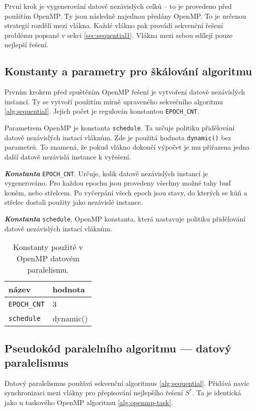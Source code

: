 \documentclass{article}
\newcommand{\const}[1]{\texttt{#1}}
\newcommand{\konstanta}[1]{\textbf{\textit{Konstanta}} \const{#1}.}
\begin{document}
    První krok je vygenerování datově nezávislých celků – to je provedeno před použitím OpenMP.
    Ty jsou následně najednou předány OpenMP. To je určenou strategií rozdělí mezi vlákna.
    Každé vlákno pak provádí sekvenční řešení problému popsané v sekci \ref{sec:sequential1}.
    Vlákna mezi sebou sdílejí pouze nejlepší řešení.

    \subsection{Konstanty a parametry pro škálování algoritmu}
    Prvním krokem před spuštěním OpenMP řešení je vytvoření datově nezávislých instancí.
    Ty se vytvoří použitím mírně upraveného sekvečního algoritmu \ref{alg:sequential}.
    Jejich počet je regulován konstantou \const{EPOCH_CNT}.

    Parametrem OpenMP je konstanta \const{schedule}. Ta určuje politiku přidělování datově nezávislých instací vláknům.
    Zde je použitá hodnota \const{dynamic()} bez parametrů. To znamená, že pokud vlákno dokončí výpočet je mu
    přiřazena jedna další datově nezávislá instance k vyřešení.

    \konstanta{EPOCH_CNT} Určuje, kolik datově nezávislých instancí je vygenerováno.
    Pro každou epochu jsou provedeny všechny možné tahy buď koněm, nebo střelcem.
    Po vyčerpání všech epoch jsou stavy, do kterých se kůň a střelec dostali
    použity jako nezávislé instance.

    \konstanta{schedule} OpenMP konstanta, která nastavuje politiku přidělování datově nezávislých instací vláknům.

    \begin{table}[hb]
        \centering
        \begin{tabular}{|l|l|}
            \hline
            název      & hodnota \\ \hline
            \const{EPOCH_CNT} & 3       \\ \hline
            \const{schedule} & dynamic()      \\ \hline
        \end{tabular}
        \caption{Konstanty použité v OpenMP datovém paralelismu.}
        \label{tab:data-par-constants}
    \end{table}

    \subsection{Pseudokód paralelního algoritmu — datový paralelismus}
    Datový paralelismus použává sekvenční algoritmus \ref{alg:sequential}.
    Přidává navíc synchronizaci mezi vlákny pro přepisování nejlepšího řešení $S^*$.
    Ta je identická jako u taskového OpenMP algoritmu \ref{alg:openmp-task}.
\end{document}
